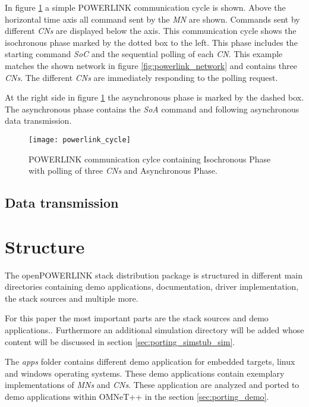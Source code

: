 In figure \ref{fig:powerlink_cycle} a simple POWERLINK communication cycle is shown.
Above the horizontal time axis all command sent by the \emph{MN} are shown.
Commands sent by different \emph{CNs} are displayed below the axis.
This communication cycle shows the isochronous phase marked by the dotted box to the left.
This phase includes the starting command \emph{SoC} and the sequential polling of each \emph{CN}.
This example matches the shown network in figure \ref{fig:powerlink_network} and contains three \emph{CNs}.
The different \emph{CNs} are immediately responding to the polling request.

At the right side in figure \ref{fig:powerlink_cycle} the asynchronous phase is marked by the dashed box.
The asynchronous phase contains the \emph{SoA} command  and following asynchronous data transmission.

\begin{figure}
    \centering
    \texttt{[image: powerlink\_cycle]}
    \caption{POWERLINK communication cylce containing Isochronous Phase with polling of three \emph{CNs} and Asynchronous Phase.}
    \label{fig:powerlink_cycle}
\end{figure}

\subsection{Data transmission}
\label{sec:oplk_powerlink_data}


\section{Structure}
\label{sec:oplk_structure}
The openPOWERLINK stack distribution package is structured in different main directories containing demo applications, documentation, driver implementation, the stack sources and multiple more.

For this paper the most important parts are the stack sources and demo applications..
Furthermore an additional simulation directory will be added whose content will be discussed in section \ref{sec:porting_simstub_sim}.

The \emph{apps} folder contains different demo application for embedded targets, linux and windows operating systems.
These demo applications contain exemplary implementations of \emph{MNs} and \emph{CNs}.
These application are analyzed and ported to demo applications within OMNeT++ in the section \ref{sec:porting_demo}.

